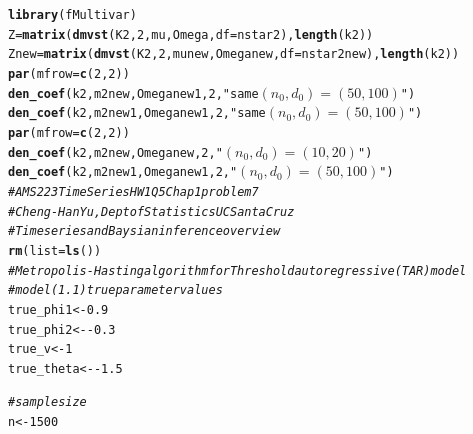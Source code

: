 \documentclass[12pt]{article}\usepackage[]{graphicx}\usepackage[]{color}
\makeatletter
\newcommand{\hlnum}[1]{\textcolor[rgb]{0.686,0.059,0.569}{#1}}%
\newcommand{\hlstr}[1]{\textcolor[rgb]{0.192,0.494,0.8}{#1}}%
\newcommand{\hlcom}[1]{\textcolor[rgb]{0.678,0.584,0.686}{\textit{#1}}}%
\newcommand{\hlopt}[1]{\textcolor[rgb]{0,0,0}{#1}}%
\newcommand{\hlstd}[1]{\textcolor[rgb]{0.345,0.345,0.345}{#1}}%
\newcommand{\hlkwb}[1]{\textcolor[rgb]{0.69,0.353,0.396}{#1}}%
\newcommand{\hlkwc}[1]{\textcolor[rgb]{0.333,0.667,0.333}{#1}}%
\newcommand{\hlkwd}[1]{\textcolor[rgb]{0.737,0.353,0.396}{\textbf{#1}}}%
\newenvironment{kframe}{%
 \def\at@end@of@kframe{}%
 \ifinner\ifhmode%
  \def\at@end@of@kframe{\end{minipage}}%
  \begin{minipage}{\columnwidth}%
 \fi\fi%
 \def\FrameCommand##1{\hskip\@totalleftmargin \hskip-\fboxsep
 \colorbox{shadecolor}{##1}\hskip-\fboxsep
     \hskip-\linewidth \hskip-\@totalleftmargin \hskip\columnwidth}%
 \MakeFramed {\advance\hsize-\width
   \@totalleftmargin\z@ \linewidth\hsize
   \@setminipage}}%
 {\par\unskip\endMakeFramed%
 \at@end@of@kframe}
\newenvironment{knitrout}{}{} %
\makeatother
\begin{document}
\begin{knitrout}
\begin{kframe}
\begin{alltt}
\hlkwd{library}\hlstd{(fMultivar)}
\hlstd{Z} \hlkwb{=} \hlkwd{matrix}\hlstd{(}\hlkwd{dmvst}\hlstd{(K2,} \hlnum{2}\hlstd{, mu, Omega,} \hlkwc{df} \hlstd{= nstar2),} \hlkwd{length}\hlstd{(k2))}
\hlstd{Znew} \hlkwb{=} \hlkwd{matrix}\hlstd{(}\hlkwd{dmvst}\hlstd{(K2,} \hlnum{2}\hlstd{, munew, Omeganew,} \hlkwc{df} \hlstd{= nstar2new),} \hlkwd{length}\hlstd{(k2))}
\hlkwd{par}\hlstd{(}\hlkwc{mfrow} \hlstd{=} \hlkwd{c}\hlstd{(}\hlnum{2}\hlstd{,} \hlnum{2}\hlstd{))}
\hlkwd{den_coef}\hlstd{(k2, m2new, Omeganew1,} \hlnum{2}\hlstd{,} \hlstr{"same $(n_0, d_0) = (50, 100)$"}\hlstd{)}
\hlkwd{den_coef}\hlstd{(k2, m2new1, Omeganew1,} \hlnum{2}\hlstd{,} \hlstr{"same $(n_0, d_0) = (50, 100)$"}\hlstd{)}
\hlkwd{par}\hlstd{(}\hlkwc{mfrow} \hlstd{=} \hlkwd{c}\hlstd{(}\hlnum{2}\hlstd{,} \hlnum{2}\hlstd{))}
\hlkwd{den_coef}\hlstd{(k2, m2new, Omeganew,} \hlnum{2}\hlstd{,} \hlstr{"$(n_0, d_0) = (10, 20)$"}\hlstd{)}
\hlkwd{den_coef}\hlstd{(k2, m2new1, Omeganew1,} \hlnum{2}\hlstd{,} \hlstr{"$(n_0, d_0) = (50, 100)$"}\hlstd{)}
\hlcom{# AMS 223 Time Series HW1 Q5 Chap 1 problem 7}
\hlcom{# Cheng-Han Yu, Dept of Statistics UC Santa Cruz}
\hlcom{# Time series and Baysian inference overview}
\hlkwd{rm}\hlstd{(}\hlkwc{list} \hlstd{=} \hlkwd{ls}\hlstd{())}
\hlcom{# Metropolis-Hasting algorithm for Threshold autoregressive (TAR) model}
\hlcom{# model(1.1) true parameter values}
\hlstd{true_phi1} \hlkwb{<-} \hlnum{0.9}
\hlstd{true_phi2} \hlkwb{<-} \hlopt{-}\hlnum{0.3}
\hlstd{true_v} \hlkwb{<-} \hlnum{1}
\hlstd{true_theta} \hlkwb{<-} \hlopt{-}\hlnum{1.5}

\hlcom{# sample size}
\hlstd{n} \hlkwb{<-} \hlnum{1500}


\end{alltt}
\end{kframe}
\end{knitrout}
\end{document}
